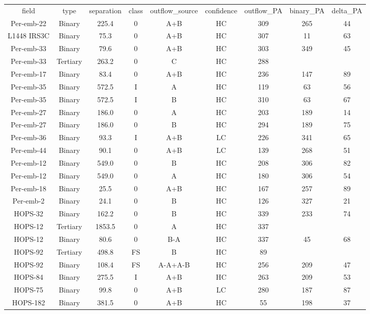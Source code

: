 \begin{deluxetable}
\begin{tabular}{ccccccccc}
field & type & separation & class & outflow_source & confidence & outflow_PA & binary_PA & delta_PA \\
Per-emb-22 & Binary & 225.4 & 0 & A+B & HC & 309 & 265 & 44 \\
L1448 IRS3C & Binary & 75.3 & 0 & A+B & HC & 307 & 11 & 63 \\
Per-emb-33 & Binary & 79.6 & 0 & A+B & HC & 303 & 349 & 45 \\
Per-emb-33 & Tertiary & 263.2 & 0 & C & HC & 288 & \nodata & \nodata \\
Per-emb-17 & Binary & 83.4 & 0 & A+B & HC & 236 & 147 & 89 \\
Per-emb-35 & Binary & 572.5 & I & A & HC & 119 & 63 & 56 \\
Per-emb-35 & Binary & 572.5 & I & B & HC & 310 & 63 & 67 \\
Per-emb-27 & Binary & 186.0 & 0 & A & HC & 203 & 189 & 14 \\
Per-emb-27 & Binary & 186.0 & 0 & B & HC & 294 & 189 & 75 \\
Per-emb-36 & Binary & 93.3 & I & A+B & LC & 226 & 341 & 65 \\
Per-emb-44 & Binary & 90.1 & 0 & A+B & LC & 139 & 268 & 51 \\
Per-emb-12 & Binary & 549.0 & 0 & B & HC & 208 & 306 & 82 \\
Per-emb-12 & Binary & 549.0 & 0 & A & HC & 180 & 306 & 54 \\
Per-emb-18 & Binary & 25.5 & 0 & A+B & HC & 167 & 257 & 89 \\
Per-emb-2 & Binary & 24.1 & 0 & B & HC & 126 & 327 & 21 \\
HOPS-32 & Binary & 162.2 & 0 & B & HC & 339 & 233 & 74 \\
HOPS-12 & Tertiary & 1853.5 & 0 & A & HC & 337 & \nodata & \nodata \\
HOPS-12 & Binary & 80.6 & 0 & B-A & HC & 337 & 45 & 68 \\
HOPS-92 & Tertiary & 498.8 & FS & B & HC & 89 & \nodata & \nodata \\
HOPS-92 & Binary & 108.4 & FS & A-A+A-B & HC & 256 & 209 & 47 \\
HOPS-84 & Binary & 275.5 & I & A+B & HC & 263 & 209 & 53 \\
HOPS-75 & Binary & 99.8 & 0 & A+B & LC & 280 & 187 & 87 \\
HOPS-182 & Binary & 381.5 & 0 & A+B & HC & 55 & 198 & 37 \\

\end{tabular}
\end{deluxetable}
